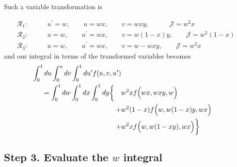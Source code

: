 \documentclass[letterpaper]{article}
\begin{document}
Such a variable transformation is 

\begin{align*}
\mathcal{R}_1:\qquad
    &u^\prime=w, \qquad u=wx, \qquad v=wxy, \quad \qquad \mathcal{J}=w^2 x
\\
\mathcal{R}_2: \qquad 
    &u=w, \qquad u^\prime=wx, \qquad v=w(1-x)y, \qquad \mathcal{J}=w^2 (1-x)
\\
\mathcal{R}_3: \qquad 
    &u=w, \qquad u^\prime=wx, \qquad v=w-wxy, \qquad \mathcal{J}= w^2x
\end{align*}
and our integral in terms of the transformed variables becomes
\begin{align}
\int_0^1 du \int_0^u dv \int_0^1 du^\prime f(u,v,u^\prime)
\nonumber \\
=\int_0^1 dw \int_0^1 dx \int_0^1 dy 
  \bigg\{\quad & w^2 x f\Big(wx, wxy, w\Big)
\nonumber \\
       + &w^2(1-x) f\Big(w, w(1-x)y, wx\Big)
\nonumber \\
       + &w^2x  f\Big(w, w(1-xy), wx\Big)
  \bigg\}
\label{TransformedEdgePanelIntegral1}
\end{align}

\subsection*{Step 3. Evaluate the $w$ integral}
\end{document}
